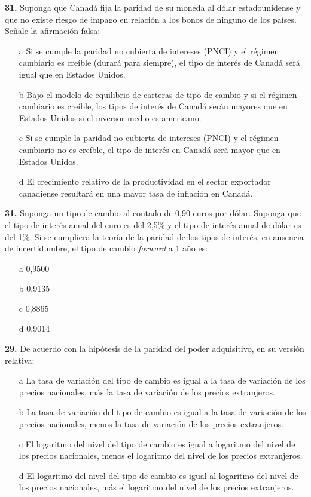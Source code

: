 \documentclass{nuevotema}
\begin{document}
\textbf{31.} Suponga que Canadá fija la paridad de su moneda al dólar estadounidense y que no existe riesgo de impago en relación a los bonos de ninguno de los países. Señale la afirmación falsa:
\begin{enumerate}
	\item[a] Si se cumple la paridad no cubierta de intereses (PNCI) y el régimen cambiario es creíble (durará para siempre), el tipo de interés de Canadá será igual que en Estados Unidos.
	\item[b] Bajo el modelo de equilibrio de carteras de tipo de cambio y si el régimen cambiario es creíble, los tipos de interés de Canadá serán mayores que en Estados Unidos si el inversor medio es americano.
	\item[c] Si se cumple la paridad no cubierta de intereses (PNCI) y el régimen cambiario no es creíble, el tipo de interés en Canadá será mayor que en Estados Unidos.
	\item[d] El crecimiento relativo de la productividad en el sector exportador canadiense resultará en una mayor tasa de inflación en Canadá.
\end{enumerate}


\textbf{31.} Suponga un tipo de cambio al contado de 0,90 euros por dólar. Suponga que el tipo de interés anual del euro es del 2,5\% y el tipo de interés anual de dólar es del 1\%. Si se cumpliera la teoría de la paridad de los tipos de interés, en ausencia de incertidumbre, el tipo de cambio \textit{forward} a 1 año es:
\begin{enumerate}
	\item[a] 0,9500
	\item[b] 0,9135
	\item[c] 0,8865
	\item[d] 0,9014
\end{enumerate}


\textbf{29.} De acuerdo con la hipótesis de la paridad del poder adquisitivo, en su versión relativa:
\begin{enumerate}
	\item[a] La tasa de variación del tipo de cambio es igual a la tasa de variación de los precios nacionales, más la tasa de variación de los precios extranjeros. 
	\item[b] La tasa de variación del tipo de cambio es igual a la tasa de variación de los precios nacionales, menos la tasa de variación de los precios extranjeros.
	\item[c] El logaritmo del nivel del tipo de cambio es igual a logaritmo del nivel de los precios nacionales, menos el logaritmo del nivel de los precios extranjeros.
	\item[d] El logaritmo del nivel del tipo de cambio es igual al logaritmo del nivel de los precios nacionales, más el logaritmo del nivel de los precios extranjeros. 
\end{enumerate}
\end{document}
